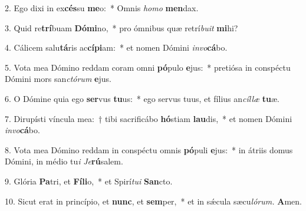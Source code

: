 \item 2. Ego dixi in ex\textbf{cés}su \textbf{me}o:~* Omnis \textit{ho}\textit{mo} \textbf{men}dax.
\item 3. Quid re\textbf{trí}buam \textbf{Dó}\textbf{mi}no,~* pro ómnibus quæ retrí\textit{bu}\textit{it} \textbf{mi}hi?
\item 4. Cálicem salu\textbf{tá}ris ac\textbf{cí}\textbf{pi}am:~* et nomen Dómini \textit{in}\textit{vo}\textbf{cá}bo.
\item 5. Vota mea Dómino reddam coram omni \textbf{pó}pulo \textbf{e}jus:~* pretiósa in conspé\-ctu Dómini mors san\textit{ctó}\textit{rum} \textbf{e}jus.
\item 6. O Dómine quia ego \textbf{ser}vus \textbf{tu}us:~* ego servus tuus, et fílius an\textit{cíl}\textit{læ} \textbf{tu}æ.
\item 7. Dirupísti víncula mea:~† tibi sacrificábo \textbf{hó}stiam \textbf{lau}dis,~* et nomen Dómini \textit{in}\textit{vo}\textbf{cá}bo.
\item 8. Vota mea Dómino reddam in conspéctu omnis \textbf{pó}puli \textbf{e}jus:~* in átriis domus Dómini, in médio tu\textit{i} \textit{Je}\textbf{rú}salem.
\item 9. Glória \textbf{Pa}tri, et \textbf{Fí}\textbf{li}o,~* et Spirí\hspace{0.03em}\textit{tui} \textbf{San}cto.
\item 10. Sicut erat in princípio, et \textbf{nunc}, et \textbf{sem}per,~* et in sǽcula sæcu\textit{lórum.} \textbf{A}men.